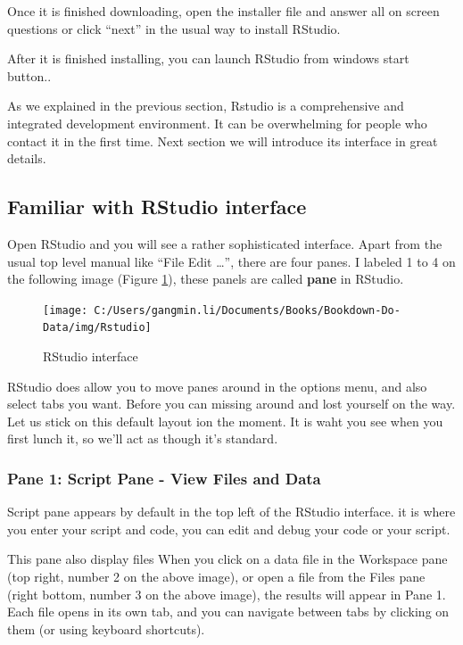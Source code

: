 \documentclass[
]{book}
\begin{document}
Once it is finished downloading, open the installer file and answer all on screen questions or click ``next'' in the usual way to install RStudio.

After it is finished installing, you can launch RStudio from windows start button..

As we explained in the previous section, Rstudio is a comprehensive and integrated development environment. It can be overwhelming for people who contact it in the first time. Next section we will introduce its interface in great details.

\hypertarget{rs}{%
\subsection{Familiar with RStudio interface}\label{rs}}

Open RStudio and you will see a rather sophisticated interface. Apart from the usual top level manual like ``File Edit \ldots{}'', there are four panes. I labeled 1 to 4 on the following image (Figure \ref{fig:RStudio}), these panels are called \textbf{pane} in RStudio.

\begin{figure}

{\centering \texttt{[image: C:/Users/gangmin.li/Documents/Books/Bookdown-Do-Data/img/Rstudio]} 

}

\caption{RStudio interface}\label{fig:RStudio}
\end{figure}

RStudio does allow you to move panes around in the options menu, and also select tabs you want. Before you can missing around and lost yourself on the way. Let us stick on this default layout ion the moment. It is waht you see when you first lunch it, so we'll act as though it's standard.

\hypertarget{pane-1-script-pane---view-files-and-data}{%
\subsubsection*{Pane 1: Script Pane - View Files and Data}\label{pane-1-script-pane---view-files-and-data}}


Script pane appears by default in the top left of the RStudio interface. it is where you enter your script and code, you can edit and debug your code or your script.

This pane also display files When you click on a data file in the Workspace pane (top right, number 2 on the above image), or open a file from the Files pane (right bottom, number 3 on the above image), the results will appear in Pane 1. Each file opens in its own tab, and you can navigate between tabs by clicking on them (or using keyboard shortcuts).
\end{document}
